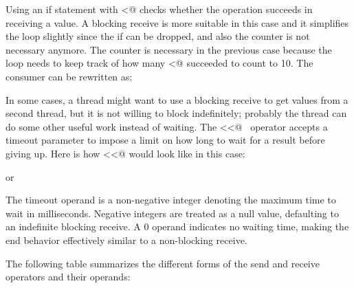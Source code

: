 
Using an \textsf{if} statement with
\textsf{{\textless}@}  checks whether the
operation succeeds in receiving a value. A blocking receive is more
suitable in this case and it simplifies the loop slightly since the
\textsf{if} can be dropped, and also the counter is not
necessary anymore. The counter is necessary in the previous case
because the loop needs to keep track of how many
\textsf{{\textless}@} succeeded to count to 10. The
consumer can be rewritten as:


In some cases, a thread might want to use a blocking receive to get
values from a second thread, but it is not willing to block
indefinitely; probably the thread can do some other useful work instead
of waiting. The \textsf{{\textless}{\textless}@}
\ operator accepts a timeout parameter to impose a limit on how long to
wait for a result before giving up. Here is how
\textsf{{\textless}{\textless}@} would look like in
this case:


or 


The timeout operand is a non-negative integer denoting the maximum time
to wait in milliseconds. Negative integers are treated as a null value,
defaulting to an indefinite blocking receive. A 0 operand indicates no
waiting time, making the end behavior effectively similar to a
non-blocking receive. 

The following table summarizes the different forms of the send and
receive operators and their operands:


\bigskip

